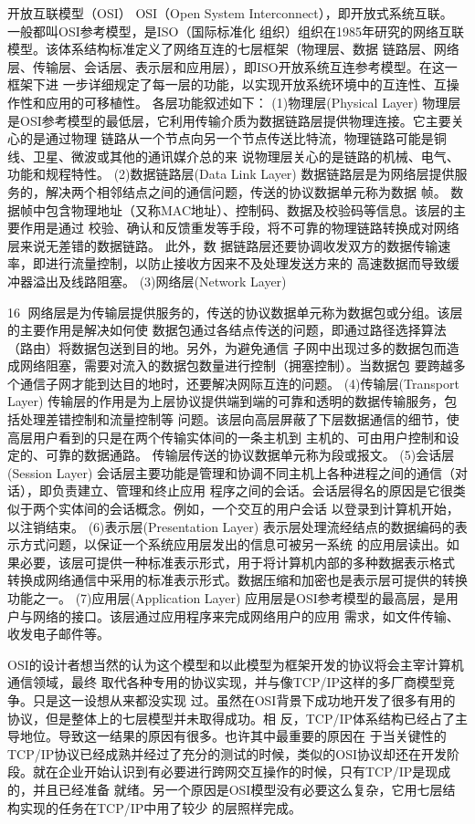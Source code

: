 开放互联模型（OSI）
OSI（Open System Interconnect），即开放式系统互联。 一般都叫OSI参考模型，是ISO（国际标准化
组织）组织在1985年研究的网络互联模型。该体系结构标准定义了网络互连的七层框架（物理层、数据
链路层、网络层、传输层、会话层、表示层和应用层），即ISO开放系统互连参考模型。在这一框架下进
一步详细规定了每一层的功能，以实现开放系统环境中的互连性、互操作性和应用的可移植性。
各层功能叙述如下：
(1)物理层(Physical Layer)
物理层是OSI参考模型的最低层，它利用传输介质为数据链路层提供物理连接。它主要关心的是通过物理
链路从一个节点向另一个节点传送比特流，物理链路可能是铜线、卫星、微波或其他的通讯媒介总的来
说物理层关心的是链路的机械、电气、功能和规程特性。
(2)数据链路层(Data Link Layer)
数据链路层是为网络层提供服务的，解决两个相邻结点之间的通信问题，传送的协议数据单元称为数据
帧。 数据帧中包含物理地址（又称MAC地址）、控制码、数据及校验码等信息。该层的主要作用是通过
校验、确认和反馈重发等手段，将不可靠的物理链路转换成对网络层来说无差错的数据链路。 此外，数
据链路层还要协调收发双方的数据传输速率，即进行流量控制，以防止接收方因来不及处理发送方来的
高速数据而导致缓冲器溢出及线路阻塞。
(3)网络层(Network Layer)

                                                            16
网络层是为传输层提供服务的，传送的协议数据单元称为数据包或分组。该层的主要作用是解决如何使
数据包通过各结点传送的问题，即通过路径选择算法（路由）将数据包送到目的地。另外，为避免通信
子网中出现过多的数据包而造成网络阻塞，需要对流入的数据包数量进行控制（拥塞控制）。当数据包
要跨越多个通信子网才能到达目的地时，还要解决网际互连的问题。
(4)传输层(Transport Layer)
传输层的作用是为上层协议提供端到端的可靠和透明的数据传输服务，包括处理差错控制和流量控制等
问题。该层向高层屏蔽了下层数据通信的细节，使高层用户看到的只是在两个传输实体间的一条主机到
主机的、可由用户控制和设定的、可靠的数据通路。 传输层传送的协议数据单元称为段或报文。
(5)会话层(Session Layer)
会话层主要功能是管理和协调不同主机上各种进程之间的通信（对话），即负责建立、管理和终止应用
程序之间的会话。会话层得名的原因是它很类似于两个实体间的会话概念。例如，一个交互的用户会话
以登录到计算机开始，以注销结束。
(6)表示层(Presentation Layer)
表示层处理流经结点的数据编码的表示方式问题，以保证一个系统应用层发出的信息可被另一系统
的应用层读出。如果必要，该层可提供一种标准表示形式，用于将计算机内部的多种数据表示格式
转换成网络通信中采用的标准表示形式。数据压缩和加密也是表示层可提供的转换功能之一。
(7)应用层(Application Layer)
应用层是OSI参考模型的最高层，是用户与网络的接口。该层通过应用程序来完成网络用户的应用
需求，如文件传输、收发电子邮件等。

OSI的设计者想当然的认为这个模型和以此模型为框架开发的协议将会主宰计算机通信领域，最终
取代各种专用的协议实现，并与像TCP/IP这样的多厂商模型竞争。只是这一设想从来都没实现
过。虽然在OSI背景下成功地开发了很多有用的协议，但是整体上的七层模型并未取得成功。相
反，TCP/IP体系结构已经占了主导地位。导致这一结果的原因有很多。也许其中最重要的原因在
于当关键性的TCP/IP协议已经成熟并经过了充分的测试的时候，类似的OSI协议却还在开发阶
段。就在企业开始认识到有必要进行跨网交互操作的时候，只有TCP/IP是现成的，并且已经准备
就绪。另一个原因是OSI模型没有必要这么复杂，它用七层结构实现的任务在TCP/IP中用了较少
的层照样完成。

